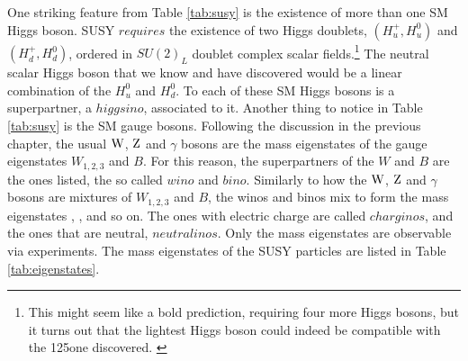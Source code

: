 One striking feature from Table \ref{tab:susy} is the existence of more than one SM Higgs boson. 
SUSY $requires$ the existence of two Higgs doublets, $(H^{+}_{u},H^{0}_{u})$ and $(H^{+}_{d},H^{0}_{d})$, ordered in $SU(2)_{L}$ doublet complex scalar fields.\footnote{This might seem like a bold prediction, requiring four more Higgs bosons, but it turns out that the lightest Higgs boson could indeed be compatible with the 125\GeV one discovered. \cite{Ellis:1638463}}
The neutral scalar Higgs boson that we know and have discovered would be a linear combination of the $H^{0}_{u}$ and $H^{0}_{d}$.  
To each of these SM Higgs bosons is a superpartner, a $higgsino$, associated to it. 
\newpara
\noindent\justify
Another thing to notice in Table \ref{tab:susy} is the SM gauge bosons. 
Following the discussion in the previous chapter, the usual $\mathrm{W}$, $\mathrm{Z}$ and $\gamma$ bosons are the mass eigenstates of the gauge eigenstates $W_{1,2,3}$ and $B$. 
For this reason, the superpartners of the $W$ and $B$ are the ones listed, the so called $wino$ and $bino$. 
Similarly to how the $\mathrm{W}$, $\mathrm{Z}$ and $\gamma$ bosons are mixtures of $W_{1,2,3}$ and $B$, the winos and binos mix to form the mass eigenstates \firstcharg, \secondcharg\firstchi, \secondchi and so on. 
The ones with electric charge are called $charginos$, and the ones that are neutral, $neutralinos$.   
Only the mass eigenstates are observable via experiments. The mass eigenstates of the SUSY particles are listed in Table \ref{tab:eigenstates}.  
